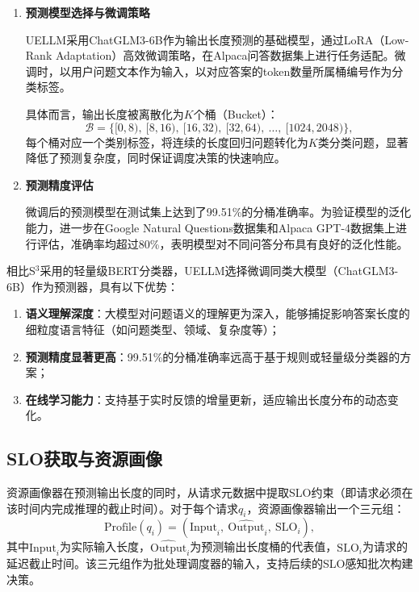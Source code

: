 \begin{enumerate}
  
\item \textbf{预测模型选择与微调策略}

UELLM采用ChatGLM3-6B\cite{du2022glm}作为输出长度预测的基础模型，通过LoRA（Low-Rank Adaptation）\cite{dettmers2023qlora}高效微调策略，在Alpaca\cite{alpaca}问答数据集上进行任务适配。微调时，以用户问题文本作为输入，以对应答案的token数量所属桶编号作为分类标签。

具体而言，输出长度被离散化为$K$个桶（Bucket）：
\begin{equation}
    \mathcal{B} = \{[0,8),\ [8,16),\ [16,32),\ [32,64),\ \ldots,\ [1024,2048)\},
    \label{eq:bucket_definition}
\end{equation}
每个桶对应一个类别标签，将连续的长度回归问题转化为$K$类分类问题，显著降低了预测复杂度，同时保证调度决策的快速响应。

\item \textbf{预测精度评估}

微调后的预测模型在测试集上达到了99.51\%的分桶准确率。为验证模型的泛化能力，进一步在Google Natural Questions数据集和Alpaca GPT-4数据集上进行评估，准确率均超过80\%，表明模型对不同问答分布具有良好的泛化性能\cite{he2024uellm}。

\end{enumerate}
相比S$^3$\cite{jin2023s3}采用的轻量级BERT分类器，UELLM选择微调同类大模型（ChatGLM3-6B）作为预测器，具有以下优势：
\begin{enumerate}
    \item \textbf{语义理解深度}：大模型对问题语义的理解更为深入，能够捕捉影响答案长度的细粒度语言特征（如问题类型、领域、复杂度等）；
    \item \textbf{预测精度显著更高}：99.51\%的分桶准确率远高于基于规则或轻量级分类器的方案；
    \item \textbf{在线学习能力}：支持基于实时反馈的增量更新，适应输出长度分布的动态变化。
\end{enumerate}

\subsection{SLO获取与资源画像}

资源画像器在预测输出长度的同时，从请求元数据中提取SLO约束（即请求必须在该时间内完成推理的截止时间）。对于每个请求$q_i$，资源画像器输出一个三元组：
\begin{equation}
    \text{Profile}(q_i) = (\text{Input}_i,\ \widehat{\text{Output}}_i,\ \text{SLO}_i),
    \label{eq:profile}
\end{equation}
其中$\text{Input}_i$为实际输入长度，$\widehat{\text{Output}}_i$为预测输出长度桶的代表值，$\text{SLO}_i$为请求的延迟截止时间。该三元组作为批处理调度器的输入，支持后续的SLO感知批次构建决策。

